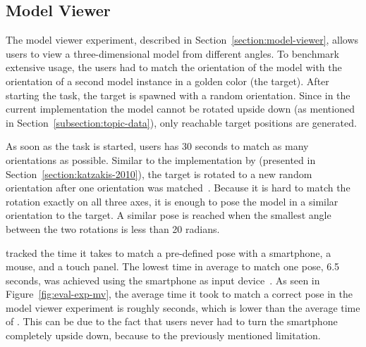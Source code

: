 \subsection{Model Viewer}\label{section:eval-res-mv}

The model viewer experiment, described in Section~\ref{section:model-viewer}, allows users to view a three-dimensional model from different angles. To benchmark extensive usage, the users had to match the orientation of the model with the orientation of a second model instance in a golden color (the target). After starting the task, the target is spawned with a random orientation.
Since in the current implementation the model cannot be rotated upside down (as mentioned in Section~\ref{subsection:topic-data}), only reachable target positions are generated.

As soon as the task is started, users has 30 seconds to match as many orientations as possible. Similar to the implementation by \citeauthor{Katzakis.2010} (presented in Section~\ref{section:katzakis-2010}), the target is rotated to a new random orientation after one orientation was matched~\cite[140]{Katzakis.2010}.
Because it is hard to match the rotation exactly on all three axes, it is enough to pose the model in a similar orientation to the target. A similar pose is reached when the smallest angle between the two rotations is less than 20 radians.

\citeauthor{Katzakis.2010} tracked the time it takes to match a pre-defined pose with a smartphone, a mouse, and a touch panel. The lowest time in average to match one pose, 6.5 seconds, was achieved using the smartphone as input device~\cite[140]{Katzakis.2010}. As seen in Figure~\ref{fig:eval-exp-mv}, the average time it took to match a correct pose in the model viewer experiment is roughly \evalExpMvAvgPoses{} seconds, which is lower than the average time of \citeauthor{Katzakis.2010}. This can be due to the fact that users never had to turn the smartphone completely upside down, because to the previously mentioned limitation.

